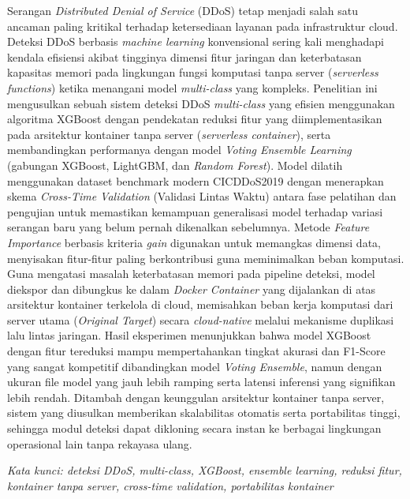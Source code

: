 \documentclass[10pt,a4paper]{article}
\begin{document}
\begin{center}
\begin{justify}
{\fontsize{10pt}{12pt}\selectfont
Serangan \textit{Distributed Denial of Service} (DDoS) tetap menjadi salah satu ancaman paling kritikal terhadap ketersediaan layanan pada infrastruktur cloud. Deteksi DDoS berbasis \textit{machine learning} konvensional sering kali menghadapi kendala efisiensi akibat tingginya dimensi fitur jaringan dan keterbatasan kapasitas memori pada lingkungan fungsi komputasi tanpa server (\textit{serverless functions}) ketika menangani model \textit{multi-class} yang kompleks. Penelitian ini mengusulkan sebuah sistem deteksi DDoS \textit{multi-class} yang efisien menggunakan algoritma XGBoost dengan pendekatan reduksi fitur yang diimplementasikan pada arsitektur kontainer tanpa server (\textit{serverless container}), serta membandingkan performanya dengan model \textit{Voting Ensemble Learning} (gabungan XGBoost, LightGBM, dan \textit{Random Forest}). Model dilatih menggunakan dataset benchmark modern CICDDoS2019 dengan menerapkan skema \textit{Cross-Time Validation} (Validasi Lintas Waktu) antara fase pelatihan dan pengujian untuk memastikan kemampuan generalisasi model terhadap variasi serangan baru yang belum pernah dikenalkan sebelumnya. Metode \textit{Feature Importance} berbasis kriteria \textit{gain} digunakan untuk memangkas dimensi data, menyisakan fitur-fitur paling berkontribusi guna meminimalkan beban komputasi. Guna mengatasi masalah keterbatasan memori pada pipeline deteksi, model diekspor dan dibungkus ke dalam \textit{Docker Container} yang dijalankan di atas arsitektur kontainer terkelola di cloud, memisahkan beban kerja komputasi dari server utama (\textit{Original Target}) secara \textit{cloud-native} melalui mekanisme duplikasi lalu lintas jaringan. Hasil eksperimen menunjukkan bahwa model XGBoost dengan fitur tereduksi mampu mempertahankan tingkat akurasi dan F1-Score yang sangat kompetitif dibandingkan model \textit{Voting Ensemble}, namun dengan ukuran file model yang jauh lebih ramping serta latensi inferensi yang signifikan lebih rendah. Ditambah dengan keunggulan arsitektur kontainer tanpa server, sistem yang diusulkan memberikan skalabilitas otomatis serta portabilitas tinggi, sehingga modul deteksi dapat dikloning secara instan ke berbagai lingkungan operasional lain tanpa rekayasa ulang.
}
\end{justify}

\vspace{10pt}

{\fontsize{10pt}{12pt}\selectfont\textit{Kata kunci: deteksi DDoS, multi-class, XGBoost, ensemble learning, reduksi fitur, kontainer tanpa server, cross-time validation, portabilitas kontainer}}


\end{center}
\end{document}
